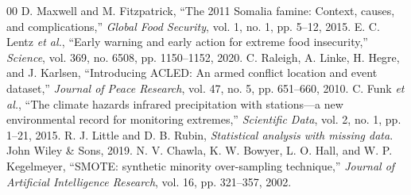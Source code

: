 \documentclass[10pt,twocolumn,letterpaper]{article}
\begin{document}
\begin{thebibliography}{00}
 D. Maxwell and M. Fitzpatrick, ``The 2011 Somalia famine: Context, causes, and complications,'' \emph{Global Food Security}, vol. 1, no. 1, pp. 5--12, 2015.
 E. C. Lentz \emph{et al.}, ``Early warning and early action for extreme food insecurity,'' \emph{Science}, vol. 369, no. 6508, pp. 1150--1152, 2020.
 C. Raleigh, A. Linke, H. Hegre, and J. Karlsen, ``Introducing ACLED: An armed conflict location and event dataset,'' \emph{Journal of Peace Research}, vol. 47, no. 5, pp. 651--660, 2010.
 C. Funk \emph{et al.}, ``The climate hazards infrared precipitation with stations—a new environmental record for monitoring extremes,'' \emph{Scientific Data}, vol. 2, no. 1, pp. 1--21, 2015.
 R. J. Little and D. B. Rubin, \emph{Statistical analysis with missing data}. John Wiley \& Sons, 2019.
 N. V. Chawla, K. W. Bowyer, L. O. Hall, and W. P. Kegelmeyer, ``SMOTE: synthetic minority over-sampling technique,'' \emph{Journal of Artificial Intelligence Research}, vol. 16, pp. 321--357, 2002.
\end{thebibliography}
\end{document}
